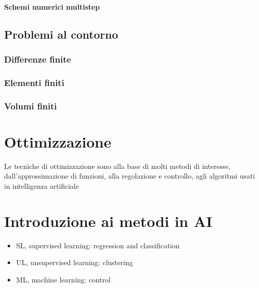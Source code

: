 \documentclass[letterpaper,10pt,english]{jupyterBook}
\begin{document}
\paragraph{Schemi numerici multi\sphinxhyphen{}step}
\label{\detokenize{ch/numerics/ode-cauchy:schemi-numerici-multi-step}}
\sphinxstepscope


\subsection{Problemi al contorno}
\label{\detokenize{ch/numerics/ode-boundary:problemi-al-contorno}}\label{\detokenize{ch/numerics/ode-boundary::doc}}

\subsubsection{Differenze finite}
\label{\detokenize{ch/numerics/ode-boundary:differenze-finite}}

\subsubsection{Elementi finiti}
\label{\detokenize{ch/numerics/ode-boundary:elementi-finiti}}

\subsubsection{Volumi finiti}
\label{\detokenize{ch/numerics/ode-boundary:volumi-finiti}}
\sphinxstepscope


\section{Ottimizzazione}
\label{\detokenize{ch/numerics/optimization:ottimizzazione}}\label{\detokenize{ch/numerics/optimization::doc}}
\sphinxAtStartPar
Le tecniche di ottimizzazione sono alla base di molti metodi di interesse, dall’approssimazione di funzioni, alla regolazione e controllo, agli algoritmi usati in intelligenza artificiale

\sphinxstepscope


\section{Introduzione ai metodi in AI}
\label{\detokenize{ch/ai:introduzione-ai-metodi-in-ai}}\label{\detokenize{ch/ai:book-ai-hs}}\label{\detokenize{ch/ai::doc}}\begin{itemize}
\item {} 
\sphinxAtStartPar
SL, supervised learning: regression and classification

\item {} 
\sphinxAtStartPar
UL, unsupervised learning: clustering

\item {} 
\sphinxAtStartPar
ML, machine learning: control

\end{itemize}
\end{document}
